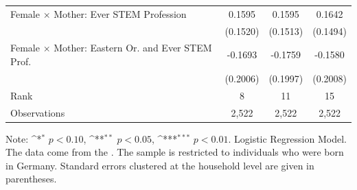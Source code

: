 \documentclass[a4paper, oneside, hyperfootnotes = false]{article}
\def\sym#1{\ifmmode^{#1}\else\(^{#1}\)\fi}
\begin{document}
{\begin{table}[ht]
\begin{center}
\begin{tabular}{l*{3}{c}}
			\addlinespace
			Female $\times$ Mother: Ever STEM Profession&      0.1595         &      0.1595         &      0.1642         \\
			&    (0.1520)         &    (0.1513)         &    (0.1494)         \\
			\addlinespace
			Female $\times$ Mother: Eastern Or. and Ever STEM Prof. &     -0.1693         &     -0.1759         &     -0.1580         \\
			&    (0.2006)         &    (0.1997)         &    (0.2008)         \\
			\midrule
			Rank                &      8         &     11         &     15         \\
			Observations                   &   2,522         &   2,522         &   2,522         \\
			\bottomrule
		\end{tabular}
		
		\vspace{2mm}
		
		\parbox{10cm}{
			\linespread{1}\footnotesize Note: \sym{*} \(p<0.10\), \sym{**} \(p<0.05\), \sym{***} \(p<0.01\). Logistic Regression Model. The data come from the \cite{SOEP2023}. The sample is restricted to individuals who were born in Germany. Standard errors clustered at the household level are given in parentheses.}
		
	\end{center}
\end{table}

}
\end{document}
